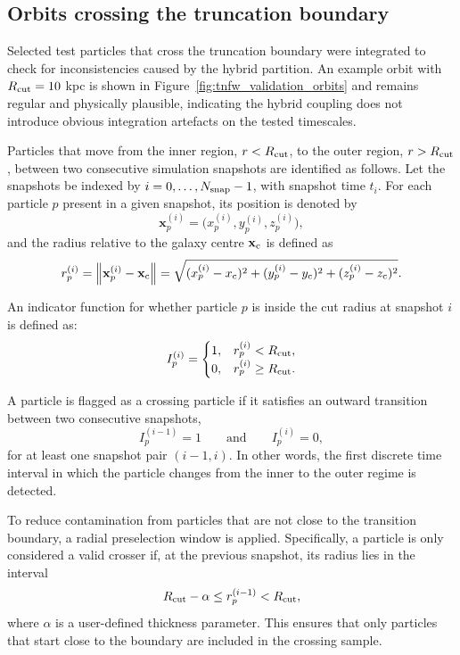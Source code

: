 \subsection{Orbits crossing the truncation boundary}

Selected test particles that cross the truncation boundary were integrated to check for inconsistencies caused by the hybrid partition. An example orbit with $R_{\rm cut} = 10$ kpc is shown in Figure~\ref{fig:tnfw_validation_orbits} and remains regular and physically plausible, indicating the hybrid coupling does not introduce obvious integration artefacts on the tested timescales.

Particles that move from the inner region, $r < R_{\rm cut}$, to the outer region, $r > R_{\rm cut}$, between two consecutive simulation snapshots are identified as follows. Let the snapshots be indexed by $i=0,\dots,N_{\rm snap}-1$, with snapshot time $t_i$. For each particle $p$ present in a given snapshot, its position is denoted by
\begin{equation}
\mathbf{x}_{p}^{(i)} = \bigl(x_p^{(i)}, y_p^{(i)}, z_p^{(i)}\bigr),
\end{equation}
and the radius relative to the galaxy centre $\mathbf{x}_{\rm c}$ is defined as
\begin{equation}
r_p^{(i)} = \left\lVert \mathbf{x}_{p}^{(i)} - \mathbf{x}_{\rm c} \right\rVert
= \sqrt{(x_p^{(i)}-x_{\rm c})^2 + (y_p^{(i)}-y_{\rm c})^2 + (z_p^{(i)}-z_{\rm c})^2}.
\end{equation}

An indicator function for whether particle $p$ is inside the cut radius at snapshot $i$ is defined as:
\begin{equation}
I_p^{(i)} =
\begin{cases}
1, & r_p^{(i)} < R_{\rm cut}, \\
0, & r_p^{(i)} \ge R_{\rm cut}.
\end{cases}
\end{equation}

A particle is flagged as a crossing particle if it satisfies an outward transition between two consecutive snapshots,
\begin{equation}
I_p^{(i-1)} = 1
\qquad \text{and} \qquad
I_p^{(i)} = 0,
\end{equation}
for at least one snapshot pair $(i-1,i)$. In other words, the first discrete time interval in which the particle changes from the inner to the outer regime is detected.

To reduce contamination from particles that are not close to the transition boundary, a radial preselection window is applied. Specifically, a particle is only considered a valid crosser if, at the previous snapshot, its radius lies in the interval
\begin{equation}
R_{\rm cut} - \alpha \le r_p^{(i-1)} < R_{\rm cut},
\end{equation}
where $\alpha$ is a user-defined thickness parameter. This ensures that only particles that start close to the boundary are included in the crossing sample.

